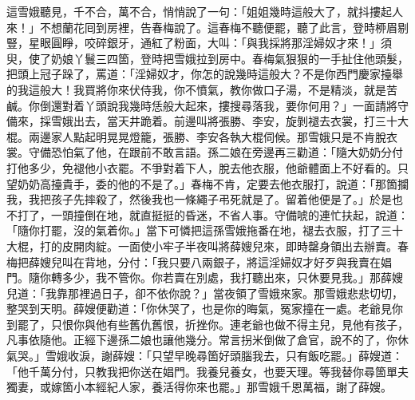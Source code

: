 這雪娥聽見，千不合，萬不合，悄悄說了一句：「姐姐幾時這般大了，就抖摟起人來！」{}不想蘭花囘到房裡，告春梅說了。這春梅不聽便罷，聽了此言，登時桺眉剔豎，星眼圓睜，咬碎銀牙，通紅了粉面，大叫：「與我採將那淫婦奴才來！」須臾，使了奶娘丫鬟三四箇，登時把雪娥拉到房中。春梅氣狠狠的一手扯住他頭髮，把頭上冠子跺了，罵道：「淫婦奴才，你怎的說幾時這般大？不是你西門慶家擡舉的我這般大！我買將你來伏侍我，你不憤氣，教你做口子湯，不是精淡，就是苦鹹。你倒還對着丫頭說我幾時恁般大起來，摟搜尋落我，要你何用？」一面請將守備來，採雪娥出去，當天井跪着。前邊叫將張勝、李安，旋剝褪去衣裳，打三十大棍。兩邊家人點起明晃晃燈籠，張勝、李安各執大棍伺候。那雪娥只是不肯脫衣裳。守備恐怕氣了他，在跟前不敢言語。孫二娘在旁邊再三勸道：「隨大奶奶分付打他多少，免褪他小衣罷。不爭對着下人，脫去他衣服，他爺體面上不好看的。只望奶奶高擡貴手，委的他的不是了。」春梅不肯，定要去他衣服打，說道：「那箇攔我，我把孩子先摔殺了，然後我也一條繩子弔死就是了。留着他便是了。」{}於是也不打了，一頭撞倒在地，就直挺挺的昏迷，不省人事。守備唬的連忙扶起，說道：「隨你打罷，沒的氣着你。」當下可憐把這孫雪娥拖番在地，褪去衣服，打了三十大棍，打的皮開肉綻。一面使小牢子半夜叫將薛嫂兒來，即時罄身領出去辦賣。春梅把薛嫂兒叫在背地，分付：「我只要八兩銀子，將這淫婦奴才好歹與我賣在娼門。隨你轉多少，我不管你。你若賣在別處，我打聽出來，只休要見我。」那薛嫂兒道：「我靠那裡過日子，卻不依你說？」當夜領了雪娥來家。那雪娥悲悲切切，整哭到天明。薛嫂便勸道：「你休哭了，也是你的晦氣，冤家撞在一處。{}老爺見你到罷了，只恨你與他有些舊仇舊恨，折挫你。連老爺也做不得主兒，見他有孩子，凡事依隨他。正經下邊孫二娘也讓他幾分。常言拐米倒做了倉官，說不的了，你休氣哭。」雪娥收淚，謝薛嫂：「只望早晚尋箇好頭腦我去，只有飯吃罷。」薛嫂道：「他千萬分付，只教我把你送在娼門。我養兒養女，也要天理。等我替你尋箇單夫獨妻，或嫁箇小本經紀人家，養活得你來也罷。」那雪娥千恩萬福，謝了薛嫂。

